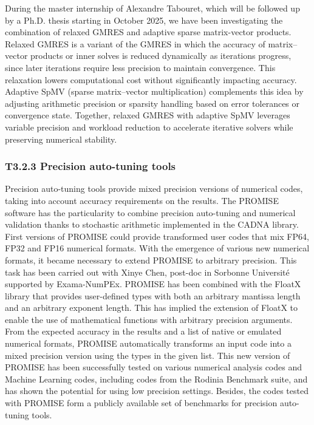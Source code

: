During the master internship of Alexandre Tabouret, which will be followed up by a Ph.D. thesis starting in October 2025, we have been investigating the combination of relaxed GMRES and adaptive sparse matrix-vector products. Relaxed GMRES is a variant of the GMRES in which the accuracy of matrix–vector products or inner solves is reduced dynamically as iterations progress, since later iterations require less precision to maintain convergence. This relaxation lowers computational cost without significantly impacting accuracy. Adaptive SpMV (sparse matrix–vector multiplication) complements this idea by adjusting arithmetic precision or sparsity handling based on error tolerances or convergence state. Together, relaxed GMRES with adaptive SpMV leverages variable precision and workload reduction to accelerate iterative solvers while preserving numerical stability.

\subsubsection{ 
T3.2.3 Precision auto-tuning tools
} 

Precision auto-tuning tools provide mixed precision versions of
numerical codes, taking into account accuracy requirements on the results. 
The PROMISE software has the particularity to combine precision auto-tuning and numerical validation thanks to stochastic arithmetic implemented in the CADNA library. First versions of PROMISE 
could provide transformed user codes that mix FP64, FP32 and FP16 numerical formats. 
With the emergence of various new numerical formats, it became necessary to extend PROMISE to arbitrary precision. This task has been carried out with
Xinye Chen, post-doc in Sorbonne Université supported by Exama-NumPEx. 
PROMISE has been combined with the FloatX library that provides user-defined types with both an arbitrary mantissa length and an arbitrary exponent length. 
This has implied the extension of FloatX to enable the use of mathematical functions with arbitrary precision arguments. 
From the expected accuracy in the results and a list of native or emulated numerical formats, PROMISE automatically transforms an input code into a mixed precision version using the types in the given list. This new version of PROMISE has been successfully tested on various numerical analysis
codes and Machine Learning codes, including codes from the Rodinia Benchmark suite, and has shown the potential for using low precision settings. 
Besides, the codes tested with PROMISE form a publicly available set of benchmarks for precision auto-tuning tools.


